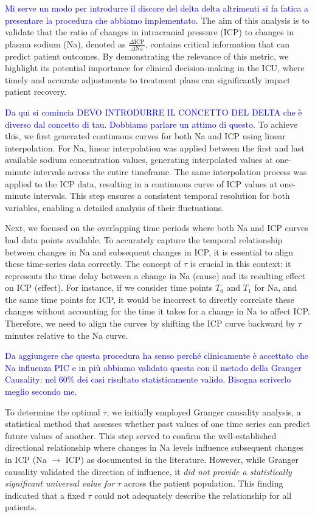 \textcolor{blue}{Mi serve un modo per introdurre il discore del delta delta altrimenti si fa fatica a presentare la procedura che abbiamo implementato}.
The aim of this analysis is to validate that the ratio of changes in intracranial pressure (ICP) to changes in plasma sodium (Na), denoted as \(\frac{\Delta \text{ICP}}{\Delta \text{Na}}\), contains critical information that can predict patient outcomes. By demonstrating the relevance of this metric, we highlight its potential importance for clinical decision-making in the ICU, where timely and accurate adjustments to treatment plans can significantly impact patient recovery.

\textcolor{blue}{Da qui si comincia}
\textcolor{blue}{DEVO INTRODURRE IL CONCETTO DEL DELTA che è diverso dal concetto di tau. Dobbiamo parlare un attimo di questo. }
To achieve this, we first generated continuous curves for both Na and ICP using linear interpolation. For Na, linear interpolation was applied between the first and last available sodium concentration values, generating interpolated values at one-minute intervals across the entire timeframe. The same interpolation process was applied to the ICP data, resulting in a continuous curve of ICP values at one-minute intervals. This step ensures a consistent temporal resolution for both variables, enabling a detailed analysis of their fluctuations.

Next, we focused on the overlapping time periods where both Na and ICP curves had data points available. To accurately capture the temporal relationship between changes in Na and subsequent changes in ICP, it is essential to align these time-series data correctly. The concept of $\tau$ is crucial in this context: it represents the time delay between a change in Na (cause) and its resulting effect on ICP (effect). For instance, if we consider time points $T_0$ and $T_1$ for Na, and the same time points for ICP, it would be incorrect to directly correlate these changes without accounting for the time it takes for a change in Na to affect ICP. Therefore, we need to align the curves by shifting the ICP curve backward by $\tau$ minutes relative to the Na curve.

\textcolor{blue}{Da aggiungere che questa procedura ha senso perché clinicamente è accettato che Na influenza PIC e in più abbiamo validato questa con il metodo della Granger Causality: nel 60\% dei casi risultato statisticamente valido. Bisogna scriverlo meglio secondo me.}

To determine the optimal $\tau$, we initially employed Granger causality analysis, a statistical method that assesses whether past values of one time series can predict future values of another. This step served to confirm the well-established directional relationship where changes in Na levels influence subsequent changes in ICP (Na $\rightarrow$ ICP) as documented in the literature. However, while Granger causality validated the direction of influence, it \textit{did not provide a statistically significant universal value for} $\tau$ across the patient population. This finding indicated that a fixed $\tau$ could not adequately describe the relationship for all patients.

